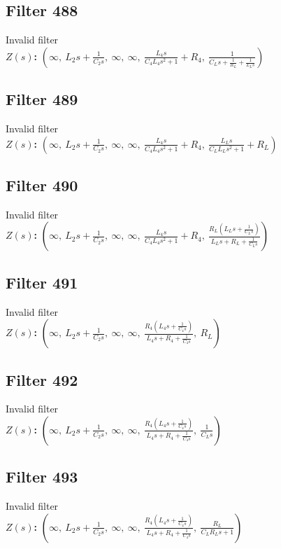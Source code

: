 \documentclass{article}
\begin{document}
\subsection*{Filter 488}
Invalid filter \\ 
\textbf{$Z(s)$:} $\left( \infty, \  L_{2} s + \frac{1}{C_{2} s}, \  \infty, \  \infty, \  \frac{L_{4} s}{C_{4} L_{4} s^{2} + 1} + R_{4}, \  \frac{1}{C_{L} s + \frac{1}{R_{L}} + \frac{1}{L_{L} s}}\right)$ \\ 
\subsection*{Filter 489}
Invalid filter \\ 
\textbf{$Z(s)$:} $\left( \infty, \  L_{2} s + \frac{1}{C_{2} s}, \  \infty, \  \infty, \  \frac{L_{4} s}{C_{4} L_{4} s^{2} + 1} + R_{4}, \  \frac{L_{L} s}{C_{L} L_{L} s^{2} + 1} + R_{L}\right)$ \\ 
\subsection*{Filter 490}
Invalid filter \\ 
\textbf{$Z(s)$:} $\left( \infty, \  L_{2} s + \frac{1}{C_{2} s}, \  \infty, \  \infty, \  \frac{L_{4} s}{C_{4} L_{4} s^{2} + 1} + R_{4}, \  \frac{R_{L} \left(L_{L} s + \frac{1}{C_{L} s}\right)}{L_{L} s + R_{L} + \frac{1}{C_{L} s}}\right)$ \\ 
\subsection*{Filter 491}
Invalid filter \\ 
\textbf{$Z(s)$:} $\left( \infty, \  L_{2} s + \frac{1}{C_{2} s}, \  \infty, \  \infty, \  \frac{R_{4} \left(L_{4} s + \frac{1}{C_{4} s}\right)}{L_{4} s + R_{4} + \frac{1}{C_{4} s}}, \  R_{L}\right)$ \\ 
\subsection*{Filter 492}
Invalid filter \\ 
\textbf{$Z(s)$:} $\left( \infty, \  L_{2} s + \frac{1}{C_{2} s}, \  \infty, \  \infty, \  \frac{R_{4} \left(L_{4} s + \frac{1}{C_{4} s}\right)}{L_{4} s + R_{4} + \frac{1}{C_{4} s}}, \  \frac{1}{C_{L} s}\right)$ \\ 
\subsection*{Filter 493}
Invalid filter \\ 
\textbf{$Z(s)$:} $\left( \infty, \  L_{2} s + \frac{1}{C_{2} s}, \  \infty, \  \infty, \  \frac{R_{4} \left(L_{4} s + \frac{1}{C_{4} s}\right)}{L_{4} s + R_{4} + \frac{1}{C_{4} s}}, \  \frac{R_{L}}{C_{L} R_{L} s + 1}\right)$ \\ 
\end{document}
